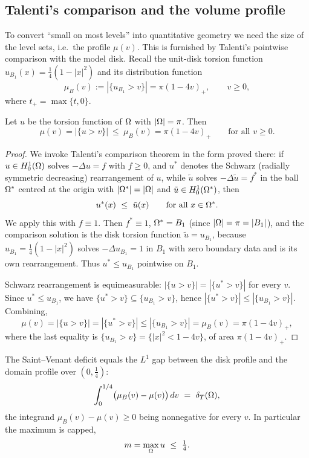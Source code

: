 \subsection{Talenti's comparison and the volume profile}

To convert ``small on most levels'' into quantitative geometry we need the
size of the level sets, i.e.\ the profile $\mu(v)$. This is furnished by
Talenti's pointwise comparison with the model disk. Recall the unit-disk
torsion function $u_{B_1}(x)=\tfrac14(1-|x|^2)$ and its distribution function
\[
   \mu_B(v):=|\{u_{B_1}>v\}|=\pi(1-4v)_+ ,
   \qquad v\ge0,
\]
where $t_+=\max\{t,0\}$.

\begin{theorem}\label{thm:talenti}
Let $u$ be the torsion function of $\Omega$ with $|\Omega|=\pi$. Then
\begin{equation}\label{eq:talenti}
   \mu(v)=|\{u>v\}|\ \le\ \mu_B(v)=\pi(1-4v)_+
   \qquad\text{for all }v\ge0 .
\end{equation}
\end{theorem}

\begin{proof}
We invoke Talenti's comparison theorem
\cite[Theorem~1]{Talenti1976} in the form proved there: if
$u\in H^1_0(\Omega)$ solves $-\Delta u=f$ with $f\ge0$, and $u^\ast$ denotes the
Schwarz (radially symmetric decreasing) rearrangement of $u$, while
$\tilde u$ solves $-\Delta\tilde u=f^\ast$ in the ball $\Omega^\ast$ centred at
the origin with $|\Omega^\ast|=|\Omega|$ and $\tilde u\in H^1_0(\Omega^\ast)$, then
\[
   u^\ast(x)\ \le\ \tilde u(x)\qquad\text{for all }x\in\Omega^\ast .
\]
We apply this with $f\equiv1$. Then $f^\ast\equiv1$, $\Omega^\ast=B_1$ (since
$|\Omega|=\pi=|B_1|$), and the comparison solution is the disk torsion function
$\tilde u=u_{B_1}$, because $u_{B_1}=\tfrac14(1-|x|^2)$ solves
$-\Delta u_{B_1}=1$ in $B_1$ with zero boundary data and is its own
rearrangement. Thus $u^\ast\le u_{B_1}$ pointwise on $B_1$.

Schwarz rearrangement is equimeasurable: $|\{u>v\}|=|\{u^\ast>v\}|$ for every
$v$. Since $u^\ast\le u_{B_1}$, we have
$\{u^\ast>v\}\subseteq\{u_{B_1}>v\}$, hence
$|\{u^\ast>v\}|\le|\{u_{B_1}>v\}|$. Combining,
\[
   \mu(v)=|\{u>v\}|=|\{u^\ast>v\}|\le|\{u_{B_1}>v\}|=\mu_B(v)
   =\pi(1-4v)_+ ,
\]
where the last equality is $\{u_{B_1}>v\}=\{|x|^2<1-4v\}$, of area
$\pi(1-4v)_+$.
\end{proof}

\begin{lemma}\label{lem:profile}
The Saint--Venant deficit equals the $L^1$ gap between the disk profile and
the domain profile over $(0,\tfrac14)$:
\begin{equation}\label{eq:profile}
   \int_0^{1/4}\bigl(\mu_B(v)-\mu(v)\bigr)\,dv\ =\ \delta_T(\Omega),
\end{equation}
the integrand $\mu_B(v)-\mu(v)\ge0$ being nonnegative for every $v$. In
particular the maximum is capped,
\begin{equation}\label{eq:mcap}
   m=\max_\Omega u\ \le\ \tfrac14 .
\end{equation}
\end{lemma}

